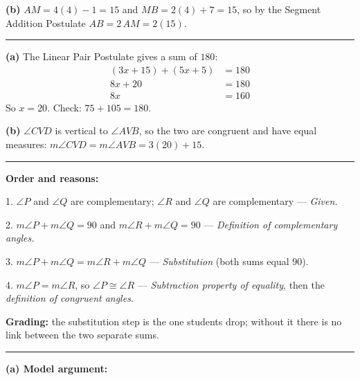 \documentclass[12pt]{article}
\begin{document}
\textbf{(b)} $AM = 4(4) - 1 = 15$ and $MB = 2(4) + 7 = 15$, so by the Segment Addition Postulate $AB = 2\,AM = 2(15)$. 

\vspace{0.2cm}\noindent\rule{\linewidth}{0.2pt}


\textbf{(a)} The Linear Pair Postulate gives a sum of $180$:
\begin{align*}
  (3x + 15) + (5x + 5) &= 180 \\
  8x + 20 &= 180 \\
  8x &= 160
\end{align*}
So $x = 20$. Check: $75 + 105 = 180$. 

\textbf{(b)} $\angle CVD$ is vertical to $\angle AVB$, so the two are congruent and have equal measures: $m\angle CVD = m\angle AVB = 3(20) + 15$. 

\vspace{0.2cm}\noindent\rule{\linewidth}{0.2pt}


\textbf{Order and reasons:}

1. $\angle P$ and $\angle Q$ are complementary; $\angle R$ and $\angle Q$ are complementary --- \emph{Given.}

2. $m\angle P + m\angle Q = 90$ and $m\angle R + m\angle Q = 90$ --- \emph{Definition of complementary angles.}

3. $m\angle P + m\angle Q = m\angle R + m\angle Q$ --- \emph{Substitution} (both sums equal $90$).

4. $m\angle P = m\angle R$, so $\angle P \cong \angle R$ --- \emph{Subtraction property of equality}, then the \emph{definition of congruent angles}.

\textbf{Grading:} the substitution step is the one students drop; without it there is no link between the two separate sums.

\vspace{0.2cm}\noindent\rule{\linewidth}{0.2pt}


\textbf{(a) Model argument:}
\end{document}
